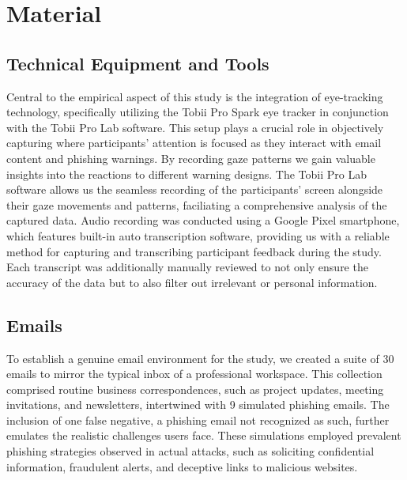 \documentclass[
  a4paper,  %
  twoside,  %
  bibliography=totoc,
  headsepline,
  cleardoublepage=empty,
  parskip=half,
  draft=false
]{scrbook}
\begin{document}
\section{Material}
\subsection{Technical Equipment and Tools}
Central to the empirical aspect of this study is the integration of eye-tracking technology, specifically utilizing the Tobii Pro Spark eye tracker in conjunction with the Tobii Pro Lab software. This setup plays a crucial role in objectively capturing where participants' attention is focused as they interact with email content and phishing warnings. By recording gaze patterns we gain valuable insights into the reactions to different warning designs. The Tobii Pro Lab software allows us the seamless recording of the participants' screen alongside their gaze movements and patterns, faciliating a comprehensive analysis of the captured data. \newline 
Audio recording was conducted using a Google Pixel smartphone, which features built-in auto transcription software, providing us with a reliable method for capturing and transcribing participant feedback during the study. Each transcript was additionally manually reviewed to not only ensure the accuracy of the data but to also filter out irrelevant or personal information.

\subsection{Emails}
To establish a genuine email environment for the study, we created a suite of 30 emails to mirror the typical inbox of a professional workspace. This collection comprised routine business correspondences, such as project updates, meeting invitations, and newsletters, intertwined with 9 simulated phishing emails. The inclusion of one false negative, a phishing email not recognized as such, further emulates the realistic challenges users face. These simulations employed prevalent phishing strategies observed in actual attacks, such as soliciting confidential information, fraudulent alerts, and deceptive links to malicious websites.
\end{document}
